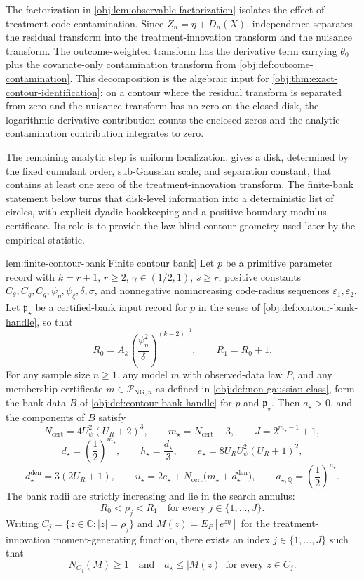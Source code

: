 \documentclass[11pt]{article}
\begin{document}
The factorization in \cref{obj:lem:observable-factorization} isolates the effect of treatment-code contamination. Since \(Z_n=\eta+D_n(X)\), independence separates the residual transform into the treatment-innovation transform and the nuisance transform. The outcome-weighted transform has the derivative term carrying \(\theta_0\) plus the covariate-only contamination transform from \cref{obj:def:outcome-contamination}. This decomposition is the algebraic input for \cref{obj:thm:exact-contour-identification}: on a contour where the residual transform is separated from zero and the nuisance transform has no zero on the closed disk, the logarithmic-derivative contribution counts the enclosed zeros and the analytic contamination contribution integrates to zero.

The remaining analytic step is uniform localization.  gives a disk, determined by the fixed cumulant order, sub-Gaussian scale, and separation constant, that contains at least one zero of the treatment-innovation transform. The finite-bank statement below turns that disk-level information into a deterministic list of circles, with explicit dyadic bookkeeping and a positive boundary-modulus certificate. Its role is to provide the law-blind contour geometry used later by the empirical statistic.

\begin{lemmav}{lem:finite-contour-bank}[Finite contour bank]
Let \(p\) be a primitive parameter record with \(k=r+1\), \(r\ge2\), \(\gamma\in(1/2,1)\), \(s\ge r\), positive constants \(C_{\theta},C_g,C_q,\psi_{\eta},\psi_{\xi},\delta,\sigma\), and nonnegative nonincreasing code-radius sequences \(\varepsilon_1,\varepsilon_2\). Let \(\mathfrak p_{\star}\) be a certified-bank input record for \(p\) in the sense of \cref{obj:def:contour-bank-handle}, so that
\[
R_0=A_k\left(\frac{\psi_{\eta}^2}{\delta}\right)^{(k-2)^{-1}},
\qquad
R_1=R_0+1 .
\]
For any sample size \(n\ge1\), any model \(m\) with observed-data law \(P\), and any membership certificate \(m\in\mathcal P_{\mathrm{NG},n}\) as defined in \cref{obj:def:non-gaussian-class}, form the bank data \(B\) of \cref{obj:def:contour-bank-handle} for \(p\) and \(\mathfrak p_{\star}\). Then \(a_{\star}>0\), and the components of \(B\) satisfy
\[
N_{\mathrm{cert}}=4U_{\psi}^{2}(U_R+2)^3,\qquad
m_{\star}=N_{\mathrm{cert}}+3,\qquad
J=2^{m_{\star}-1}+1,
\]
\[
d_{\star}=\left(\frac12\right)^{m_{\star}},\qquad
h_{\star}=\frac{d_{\star}}{3},\qquad
e_{\star}=8U_RU_{\psi}^{2}(U_R+1)^2,
\]
\[
d_{\star}^{\mathrm{den}}=3(2U_R+1),\qquad
u_{\star}=2e_{\star}+N_{\mathrm{cert}}\bigl(m_{\star}+d_{\star}^{\mathrm{den}}\bigr),\qquad
a_{\star,\mathbb Q}=\left(\frac12\right)^{u_{\star}}.
\]
The bank radii are strictly increasing and lie in the search annulus:
\[
R_0<\rho_j<R_1
\quad\text{for every }j\in\{1,\ldots,J\}.
\]
Writing \(C_j=\{z\in\mathbb C:|z|=\rho_j\}\) and \(M(z)=E_P[e^{z\eta}]\) for the treatment-innovation moment-generating function, there exists an index \(j\in\{1,\ldots,J\}\) such that
\[
N_{C_j}(M)\ge1
\quad\text{and}\quad
a_{\star}\le |M(z)|\ \text{for every }z\in C_j .
\]
\end{lemmav}
\end{document}
